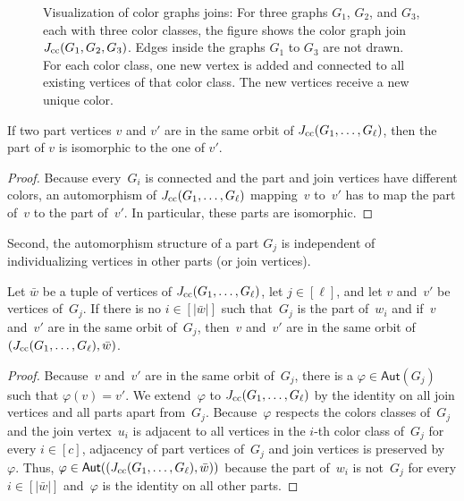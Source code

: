 \documentclass[]{lmcs}
\renewcommand{\phi}{\varphi}
\newcommand{\autoA}{\phi}
\newcommand{\autGroup}[1]{\mathsf{Aut}(#1)}
\newcommand{\tup}[1]{\bar{#1}}
\newcommand{\vertA}{u}
\newcommand{\vertB}{v}
\newcommand{\vertC}{w}
\begin{document}
\begin{figure}
\caption{Visualization of color graphs joins:
For three graphs $G_1$, $G_2$, and $G_3$, each with three color classes,
the figure shows the color graph join $J_{\text{cc}}(G_1,G_2,G_3)$.
Edges inside the graphs $G_1$ to $G_3$ are not drawn.
For each color class,
one new vertex is added and connected to all existing vertices of that color class.
The new vertices receive a new unique color.
\label{fig:color-class-join}
}
 
\end{figure}



\begin{lem}
	\label{lem:color-class-join-orbits}
	If two part vertices $\vertB$ and $\vertB'$ are in the same orbit of $J_{\text{cc}}(G_1, \dots, G_\ell)$,
	then the part of $\vertB$ is isomorphic to the one of $\vertB'$.
\end{lem}
\begin{proof}
	Because every~$G_i$ is connected
	and the part and join vertices have different colors,
	an automorphism of $J_{\text{cc}}(G_1, \dots, G_\ell)$
	mapping~$\vertB$ to~$\vertB'$
	has to map the part of~$\vertB$ to the part of~$\vertB'$.
	In particular, these parts are isomorphic.
\end{proof}
Second, the automorphism structure of a part $G_j$ is independent of
individualizing vertices in other parts (or join vertices).
\begin{lem}
	Let $\tup{\vertC}$ be a tuple of vertices of $J_{\text{cc}}(G_1, \dots, G_\ell)$, let $j \in [\ell]$,
	and let $\vertB$ and~$\vertB'$ be vertices of~$G_j$.
	If there is no $i \in [|\tup{\vertC}|]$
	such that~$G_j$ is the part of~$\vertC_i$
	and if~$\vertB$ and~$\vertB'$ are in the same orbit of~$G_j$,
	then~$\vertB$ and~$\vertB'$ are in the same orbit of $(\ccjoin{G_1, \dots, G_\ell}, \tup{\vertC})$.
\end{lem}
\begin{proof}
	Because~$\vertB$ and~$\vertB'$ are in the same orbit of~$G_j$,
	there is a $\autoA \in \autGroup{G_j}$ such that $\autoA(\vertB) = \vertB'$.
	We extend~$\autoA$ to $J_{\text{cc}}(G_1, \dots, G_\ell)$
	by the identity on all join vertices and all parts apart from~$G_j$.
	Because~$\autoA$ respects the colors classes of~$G_j$
	and the join vertex~$\vertA_i$ is adjacent to all vertices in the $i$-th color class of~$G_j$ for every $i \in [c]$,
	adjacency of part vertices of~$G_j$ and join vertices is preserved by~$\autoA$.
	Thus, $\autoA \in \autGroup{(\ccjoin{G_1, \dots, G_\ell}, \tup{\vertC})}$
	because the part of~$\vertC_i$ is not~$G_j$ for every $i \in [|\tup{\vertC}|]$
	and~$\autoA$ is the identity on all other parts.
\end{proof}
\end{document}
